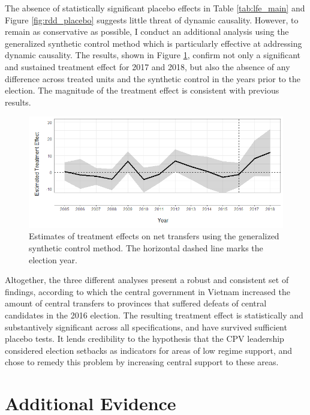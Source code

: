 \documentclass[12pt]{article}
\newcommand{\1}{\mathbbm{1}}
\begin{document}
The absence of statistically significant placebo effects in Table \ref{tab:lfe_main} and Figure \ref{fig:rdd_placebo} suggests little threat of dynamic causality. However, to remain as conservative as possible, I conduct an additional analysis using the generalized synthetic control method \citep{Xu2017gsynth} which is particularly effective at addressing dynamic causality. The results, shown in Figure \ref{fig:synth_placebo}, confirm not only a significant and sustained treatment effect for 2017 and 2018, but also the absence of any difference across treated units and the synthetic control in the years prior to the election. The magnitude of the treatment effect is consistent with previous results.

\begin{figure}[!htbp]
	\centering
	\includegraphics[width=\textwidth]{figure/200205_synth_results.png}
	\captionsetup{singlelinecheck=off}
	\caption[Estimated synthetic control treatment effects]{Estimates of treatment effects on net transfers using the generalized synthetic control method. The horizontal dashed line marks the election year.}
	\label{fig:synth_placebo}
\end{figure}

Altogether, the three different analyses present a robust and consistent set of findings, according to which the central government in Vietnam increased the amount of central transfers to provinces that suffered defeats of central candidates in the 2016 election. The resulting treatment effect is statistically and substantively significant across all specifications, and have survived sufficient placebo tests. It lends credibility to the hypothesis that the CPV leadership considered election setbacks as indicators for areas of low regime support, and chose to remedy this problem by increasing central support to these areas.

\section{Additional Evidence}
\label{sec:additional}
\end{document}
